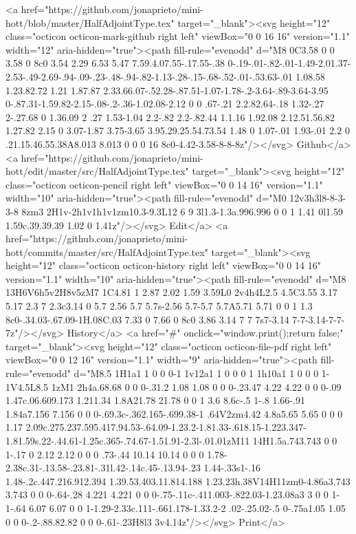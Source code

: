       <a href="https://github.com/jonaprieto/mini-hott/blob/master/HalfAdjointType.tex" target="_blank"><svg height="12" class="octicon octicon-mark-github right left" viewBox="0 0 16 16" version="1.1" width="12" aria-hidden="true"><path fill-rule="evenodd" d="M8 0C3.58 0 0 3.58 0 8c0 3.54 2.29 6.53 5.47 7.59.4.07.55-.17.55-.38 0-.19-.01-.82-.01-1.49-2.01.37-2.53-.49-2.69-.94-.09-.23-.48-.94-.82-1.13-.28-.15-.68-.52-.01-.53.63-.01 1.08.58 1.23.82.72 1.21 1.87.87 2.33.66.07-.52.28-.87.51-1.07-1.78-.2-3.64-.89-3.64-3.95 0-.87.31-1.59.82-2.15-.08-.2-.36-1.02.08-2.12 0 0 .67-.21 2.2.82.64-.18 1.32-.27 2-.27.68 0 1.36.09 2 .27 1.53-1.04 2.2-.82 2.2-.82.44 1.1.16 1.92.08 2.12.51.56.82 1.27.82 2.15 0 3.07-1.87 3.75-3.65 3.95.29.25.54.73.54 1.48 0 1.07-.01 1.93-.01 2.2 0 .21.15.46.55.38A8.013 8.013 0 0 0 16 8c0-4.42-3.58-8-8-8z"/></svg> Github</a>
      <a href="https://github.com/jonaprieto/mini-hott/edit/master/src/HalfAdjointType.tex" target="_blank"><svg height="12" class="octicon octicon-pencil right left" viewBox="0 0 14 16" version="1.1" width="10" aria-hidden="true"><path fill-rule="evenodd" d="M0 12v3h3l8-8-3-3-8 8zm3 2H1v-2h1v1h1v1zm10.3-9.3L12 6 9 3l1.3-1.3a.996.996 0 0 1 1.41 0l1.59 1.59c.39.39.39 1.02 0 1.41z"/></svg> Edit</a>
      <a href="https://github.com/jonaprieto/mini-hott/commits/master/src/HalfAdjointType.tex" target="_blank"><svg height="12" class="octicon octicon-history right left" viewBox="0 0 14 16" version="1.1" width="10" aria-hidden="true"><path fill-rule="evenodd" d="M8 13H6V6h5v2H8v5zM7 1C4.81 1 2.87 2.02 1.59 3.59L0 2v4h4L2.5 4.5C3.55 3.17 5.17 2.3 7 2.3c3.14 0 5.7 2.56 5.7 5.7s-2.56 5.7-5.7 5.7A5.71 5.71 0 0 1 1.3 8c0-.34.03-.67.09-1H.08C.03 7.33 0 7.66 0 8c0 3.86 3.14 7 7 7s7-3.14 7-7-3.14-7-7-7z"/></svg> History</a>
      <a  href="#" onclick="window.print();return false;" target="_blank"><svg height="12" class="octicon octicon-file-pdf right left" viewBox="0 0 12 16" version="1.1" width="9" aria-hidden="true"><path fill-rule="evenodd" d="M8.5 1H1a1 1 0 0 0-1 1v12a1 1 0 0 0 1 1h10a1 1 0 0 0 1-1V4.5L8.5 1zM1 2h4a.68.68 0 0 0-.31.2 1.08 1.08 0 0 0-.23.47 4.22 4.22 0 0 0-.09 1.47c.06.609.173 1.211.34 1.8A21.78 21.78 0 0 1 3.6 8.6c-.5 1-.8 1.66-.91 1.84a7.156 7.156 0 0 0-.69.3c-.362.165-.699.38-1 .64V2zm4.42 4.8a5.65 5.65 0 0 0 1.17 2.09c.275.237.595.417.94.53-.64.09-1.23.2-1.81.33-.618.15-1.223.347-1.81.59s.22-.44.61-1.25c.365-.74.67-1.51.91-2.3l-.01.01zM11 14H1.5a.743.743 0 0 1-.17 0 2.12 2.12 0 0 0 .73-.44 10.14 10.14 0 0 0 1.78-2.38c.31-.13.58-.23.81-.31l.42-.14c.45-.13.94-.23 1.44-.33s1-.16 1.48-.2c.447.216.912.394 1.39.53.403.11.814.188 1.23.23h.38V14H11zm0-4.86a3.743 3.743 0 0 0-.64-.28 4.221 4.221 0 0 0-.75-.11c-.411.003-.822.03-1.23.08a3 3 0 0 1-1-.64 6.07 6.07 0 0 1-1.29-2.33c.111-.661.178-1.33.2-2 .02-.25.02-.5 0-.75a1.05 1.05 0 0 0-.2-.88.82.82 0 0 0-.61-.23H8l3 3v4.14z"/></svg> Print</a>
